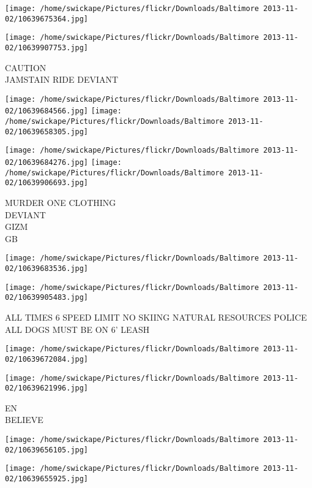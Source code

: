 \documentclass[10pt,letterpaper]{article}
\begin{document}
\texttt{[image: /home/swickape/Pictures/flickr/Downloads/Baltimore 2013-11-02/10639675364.jpg]}

\vspace{0.25in}
\texttt{[image: /home/swickape/Pictures/flickr/Downloads/Baltimore 2013-11-02/10639907753.jpg]}

CAUTION\\
JAMSTAIN RIDE DEVIANT
\pagebreak

\texttt{[image: /home/swickape/Pictures/flickr/Downloads/Baltimore 2013-11-02/10639684566.jpg]}
\texttt{[image: /home/swickape/Pictures/flickr/Downloads/Baltimore 2013-11-02/10639658305.jpg]}

\texttt{[image: /home/swickape/Pictures/flickr/Downloads/Baltimore 2013-11-02/10639684276.jpg]}
\texttt{[image: /home/swickape/Pictures/flickr/Downloads/Baltimore 2013-11-02/10639906693.jpg]}

MURDER ONE CLOTHING\\
DEVIANT\\
GIZM\\
GB
\pagebreak

\texttt{[image: /home/swickape/Pictures/flickr/Downloads/Baltimore 2013-11-02/10639683536.jpg]}

\vspace{0.25in}
\texttt{[image: /home/swickape/Pictures/flickr/Downloads/Baltimore 2013-11-02/10639905483.jpg]}

ALL TIMES 6 SPEED LIMIT NO SKIING NATURAL RESOURCES POLICE\\
ALL DOGS MUST BE ON 6' LEASH
\pagebreak

\texttt{[image: /home/swickape/Pictures/flickr/Downloads/Baltimore 2013-11-02/10639672084.jpg]}

\vspace{0.25in}
\texttt{[image: /home/swickape/Pictures/flickr/Downloads/Baltimore 2013-11-02/10639621996.jpg]}

EN\\
BELIEVE
\pagebreak

\texttt{[image: /home/swickape/Pictures/flickr/Downloads/Baltimore 2013-11-02/10639656105.jpg]}

\vspace{0.25in}
\texttt{[image: /home/swickape/Pictures/flickr/Downloads/Baltimore 2013-11-02/10639655925.jpg]}
\end{document}
